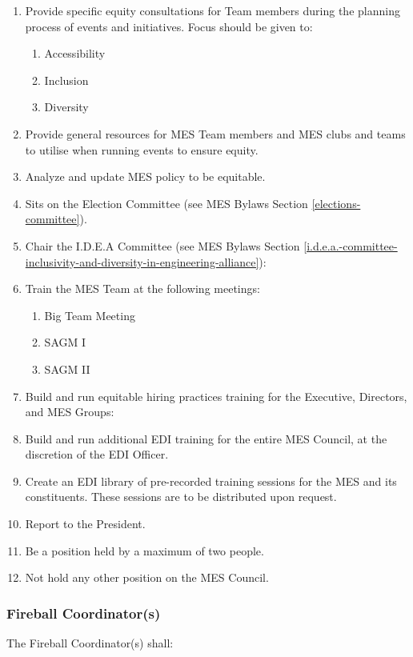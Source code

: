 \begin{enumerate}
 \item
  Provide specific equity consultations for Team members during the planning process of events and initiatives. Focus should be given to:

  \begin{enumerate}
   \item
    Accessibility
   \item
    Inclusion
   \item
    Diversity
  \end{enumerate}
 \item
  Provide general resources for MES Team members and MES clubs and teams to utilise when running events to ensure equity.
 \item
  Analyze and update MES policy to be equitable.
 \item
  Sits on the Election Committee (see MES Bylaws Section \ref{elections-committee}).
 \item
  Chair the I.D.E.A Committee (see MES Bylaws Section \ref{i.d.e.a.-committee-inclusivity-and-diversity-in-engineering-alliance}):
 \item
  Train the MES Team at the following meetings:

  \begin{enumerate}
   \item
    Big Team Meeting
   \item
    SAGM I
   \item
    SAGM II
  \end{enumerate}
 \item
  Build and run equitable hiring practices training for the Executive, Directors, and MES Groups:
 \item
  Build and run additional EDI training for the entire MES Council, at the discretion of the EDI Officer.
 \item
  Create an EDI library of pre-recorded training sessions for the MES and its constituents. These sessions are to be distributed upon request.
 \item
  Report to the President.
 \item
  Be a position held by a maximum of two people.
 \item
  Not hold any other position on the MES Council.

\end{enumerate}

\subsubsection{Fireball Coordinator(s)}
\label{fireball-coordinators}
The Fireball Coordinator(s) shall:

